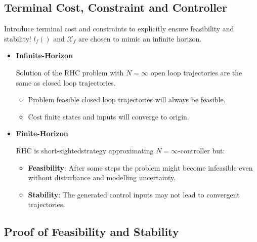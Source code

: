 \documentclass[8pt,a4paper]{scrartcl}
\begin{document}
\begin{multicols*}{3}
\section{Terminal Cost, Constraint and Controller}


\dahe Introduce terminal cost and constraints to explicitly ensure feasibility and stability!
$l_f()$ and $\mathcal{X}_f$ are chosen to mimic an infinite horizon.


\begin{itemize}
\ncompaq
\item \textbf{Infinite-Horizon}

Solution of the RHC problem with $N=\infty$ \dahe open loop trajectories are the same as closed loop trajectories.
\begin{itemize}
\ncompaq
\item Problem feasible \dahe closed loop trajectories will always be feasible.
\item Cost finite \dahe states and inputs will converge to origin.
\end{itemize}
\item \textbf{Finite-Horizon}

RHC is \glqq short-sighted\grqq strategy approximating $N=\infty$-controller but:
\begin{itemize}
\ncompaq
\item \textbf{Feasibility}: After some steps the problem might become infeasible even without disturbance and modelling uncertainty.
\item \textbf{Stability}: The generated control inputs may not lead to convergent trajectories.
\end{itemize}
\end{itemize}

\subsection{Proof of Feasibility and Stability}


\end{multicols*}
\end{document}
